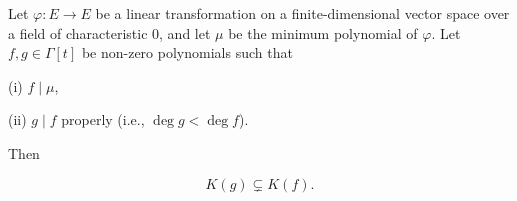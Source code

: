 Let $\varphi: E \to E$ be a linear transformation on a finite-dimensional vector space over a field of characteristic $0$, and let $\mu$ be the minimum polynomial of $\varphi$. Let $f, g \in \Gamma[t]$ be non-zero polynomials such that

(i) $f \mid \mu$,

(ii) $g \mid f$ properly (i.e., $\deg g < \deg f$).

Then

$$K(g) \subsetneq K(f).$$
